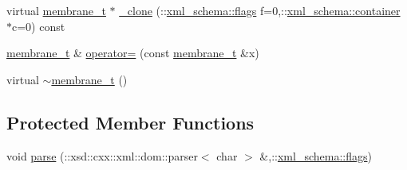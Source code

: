 \begin{DoxyCompactItemize}
\item 
virtual \hyperlink{classmembrane__t}{membrane\+\_\+t} $\ast$ \hyperlink{classmembrane__t_a53cbb200e281a93e71cf736cc46c7b5a}{\+\_\+clone} (\+::\hyperlink{namespacexml__schema_a0612287d030cb2732d31a45b258fdc87}{xml\+\_\+schema\+::flags} f=0,\+::\hyperlink{namespacexml__schema_ada9aa30dc722e93ee2ed7243085402a5}{xml\+\_\+schema\+::container} $\ast$c=0) const 
\item 
\hyperlink{classmembrane__t}{membrane\+\_\+t} \& \hyperlink{classmembrane__t_ac3c55ad3e5298f4b30d32f10bf56eb64}{operator=} (const \hyperlink{classmembrane__t}{membrane\+\_\+t} \&x)
\item 
virtual \hyperlink{classmembrane__t_a68d8b32d034e0d0fac195b59a0408ef1}{$\sim$membrane\+\_\+t} ()
\end{DoxyCompactItemize}
\subsection*{Protected Member Functions}
\begin{DoxyCompactItemize}
\item 
void \hyperlink{classmembrane__t_a159c8038fabf26e70fd5b0f41949c56c}{parse} (\+::xsd\+::cxx\+::xml\+::dom\+::parser$<$ char $>$ \&,\+::\hyperlink{namespacexml__schema_a0612287d030cb2732d31a45b258fdc87}{xml\+\_\+schema\+::flags})
\end{DoxyCompactItemize}
